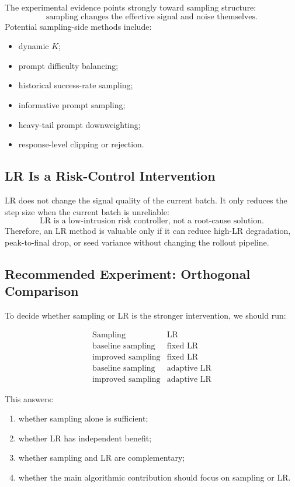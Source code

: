 \documentclass[11pt,a4paper]{article}
\begin{document}
The experimental evidence points strongly toward sampling structure:
\[
\boxed{
\text{sampling changes the effective signal and noise themselves.}
}
\]
Potential sampling-side methods include:
\begin{itemize}[leftmargin=2em]
    \item dynamic \(K\);
    \item prompt difficulty balancing;
    \item historical success-rate sampling;
    \item informative prompt sampling;
    \item heavy-tail prompt downweighting;
    \item response-level clipping or rejection.
\end{itemize}

\subsection{LR Is a Risk-Control Intervention}

LR does not change the signal quality of the current batch. It only reduces the step size when the current batch is unreliable:
\[
\boxed{
\text{LR is a low-intrusion risk controller, not a root-cause solution.}
}
\]
Therefore, an LR method is valuable only if it can reduce high-LR degradation, peak-to-final drop, or seed variance without changing the rollout pipeline.

\subsection{Recommended Experiment: Orthogonal Comparison}

To decide whether sampling or LR is the stronger intervention, we should run:

\[
\begin{array}{c|c}
\text{Sampling} & \text{LR}\\
\hline
\text{baseline sampling} & \text{fixed LR}\\
\text{improved sampling} & \text{fixed LR}\\
\text{baseline sampling} & \text{adaptive LR}\\
\text{improved sampling} & \text{adaptive LR}
\end{array}
\]

This answers:
\begin{enumerate}[leftmargin=2em]
    \item whether sampling alone is sufficient;
    \item whether LR has independent benefit;
    \item whether sampling and LR are complementary;
    \item whether the main algorithmic contribution should focus on sampling or LR.
\end{enumerate}
\end{document}
